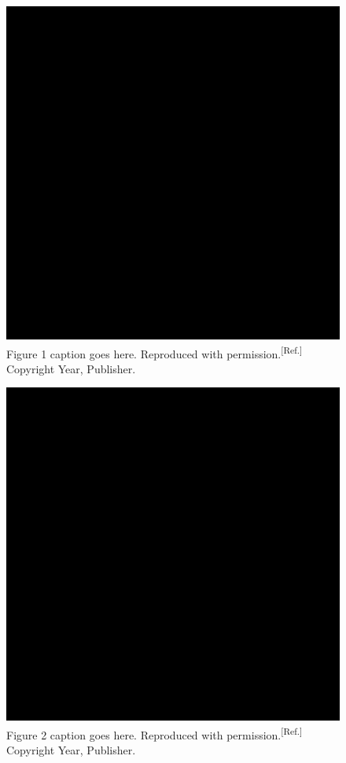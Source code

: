 \documentclass{WileyMSP-template}
\begin{document}
\begin{figure}
  \includegraphics[width=\linewidth]{placeholder-image.png}
  \caption{Figure 1 caption goes here. Reproduced with permission.\textsuperscript{[Ref.]} Copyright Year, Publisher. }
  \label{fig:boat1}
\end{figure}

\begin{figure}
  \includegraphics[width=\linewidth]{placeholder-image.png}
  \caption{Figure 2 caption goes here. Reproduced with permission.\textsuperscript{[Ref.]} Copyright Year, Publisher.}
  \label{fig:boat1}
\end{figure}
\end{document}
